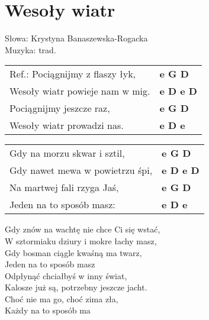 \section{Wesoły wiatr}

Słowa: Krystyna Banaszewska-Rogacka\\
Muzyka:  trad.

\vspace{2em}
\begin{tabular}{@{}p{7cm}@{}l@{}}
Ref.: Pociągnijmy z flaszy łyk,  & \bfseries   e G D \\
Wesoły wiatr powieje nam w mig.  & \bfseries   e D e D \\
Pociągnijmy jeszcze raz,  & \bfseries   e G D \\
Wesoły wiatr prowadzi nas.  & \bfseries   e D e \\
\end{tabular}

\vspace{1em}
\begin{tabular}{@{}p{7cm}@{}l@{}}
Gdy na morzu skwar i sztil,  & \bfseries   e G D \\
Gdy nawet mewa w powietrzu śpi,  & \bfseries   e D e D \\
Na martwej fali rzyga Jaś,  & \bfseries   e G D \\
Jeden na to sposób masz:  & \bfseries   e D e \\
\end{tabular}

\vspace{1em}
Gdy znów na wachtę nie chce Ci się wstać, \\
W sztormiaku dziury i mokre łachy masz, \\
Gdy bosman ciągle kwaśną ma twarz, \\
Jeden na to sposób masz \\

Odpłynąć chciałbyś w inny świat, \\
Kalosze już są, potrzebny jeszcze jacht. \\
Choć nie ma go, choć zima zła, \\
Każdy na to sposób ma \\